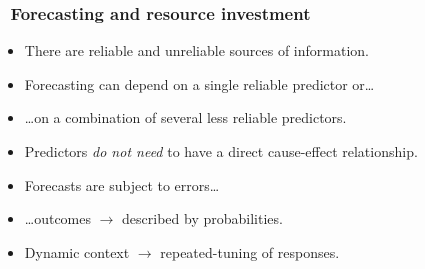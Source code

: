 \documentclass[11pt]{beamer}\usepackage[]{graphicx}\usepackage[]{xcolor}
\newcommand\basicicons[1]{{\lineabasicfont\symbol{#1}}}
\newcommand\futureicon{\colorbox{mygray}{\textcolor{black}{\basicicons{"0079}}}\xspace}
\begin{document}
\begin{frame}
\frametitle{\futureicon\ Forecasting and resource investment}
\begin{itemize}
  \item There are reliable and unreliable sources of information.
  \item Forecasting can depend on a single reliable predictor or\ldots
  \item \ldots on a combination of several less reliable predictors.
  \item Predictors \emph{do not need} to have a direct cause-effect relationship.
  \item Forecasts are subject to errors\ldots
  \item \ldots outcomes $\to$ described by probabilities.
  \item Dynamic context $\to$ repeated-tuning of responses.
\end{itemize}
\end{frame}
\end{document}
